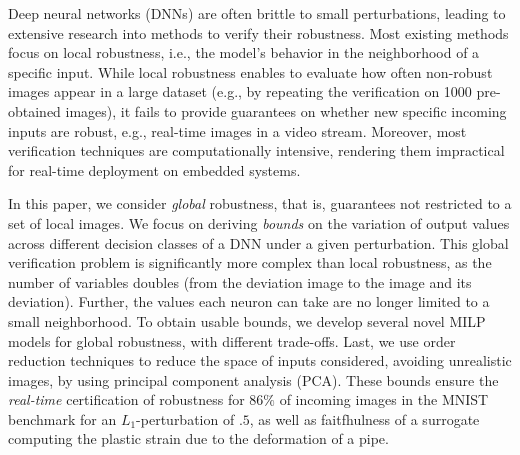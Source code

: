 Deep neural networks (DNNs) are often brittle to small perturbations, leading to extensive research into methods to verify their robustness. Most existing methods focus on local robustness, i.e., the model's behavior in the neighborhood of a specific input. While local robustness enables to evaluate how often non-robust images appear in a large dataset (e.g., by repeating the verification on 1000 pre-obtained images), it fails to provide guarantees on whether new specific incoming inputs are robust, e.g., real-time images in a video stream. Moreover, most verification techniques are computationally intensive, rendering them impractical for real-time deployment on embedded systems. 

In this paper, we consider {\em global} robustness, that is, guarantees not restricted to a set of local images. We focus on deriving {\em bounds} on the variation of output values across different decision classes of a DNN under a given perturbation. This global verification problem is significantly more complex than local robustness, as the number of variables doubles (from the deviation image to the image and its deviation). Further, the values each neuron can take are no longer limited to a small neighborhood. To obtain usable bounds, we develop several novel  MILP models for global robustness, with different trade-offs. Last, we use order reduction techniques to reduce the space of inputs considered, avoiding unrealistic images, by using principal component analysis (PCA). These bounds ensure the {\em real-time} certification of robustness for $86\%$ of incoming images in the MNIST benchmark for an $L_1$-perturbation of $.5$, as well as faitfhulness of a surrogate computing the 
plastic strain due to the deformation of a pipe.